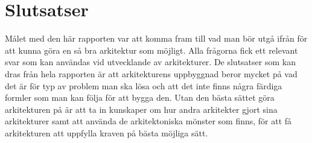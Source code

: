 \section{Slutsatser}
Målet med den här rapporten var att komma fram till vad man bör utgå ifrån för att kunna göra en så bra arkitektur som möjligt. Alla frågorna fick ett relevant svar som kan användas vid utvecklande av arkitekturer. De slutsatser som kan dras från hela rapporten är att arkitekturens uppbyggnad beror mycket på vad det är för typ av problem man ska lösa och att det inte finns några färdiga formler som man kan följa för att bygga den. Utan den bästa sättet göra arkitekturen på är att ta in kunskaper om hur andra arkitekter gjort sina arkitekturer samt att använda de arkitektoniska mönster som finns, för att få arkitekturen att uppfylla kraven på bästa möjliga sätt.

